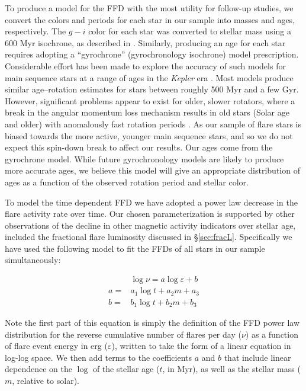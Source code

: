 \documentclass[preprint2]{aastex62}
\newcommand{\Kepler}{\textsl{Kepler}\xspace}
\begin{document}
To produce a model for the FFD with the most utility for follow-up studies, we convert the colors and periods for each star in our sample into masses and ages, respectively. The $g-i$ color for each star was converted to stellar mass using a 600 Myr isochrone, as described in \citet{davenport2016}. Similarly, producing an age for each star requires adopting a ``gyrochrone'' (gyrochronology isochrone) model prescription. Considerable effort has been made to explore the accuracy of such models for main sequence stars at a range of ages in the \Kepler era \citep[e.g.][]{mms+11,angus2015,douglas2016}. Most models produce similar age--rotation estimates for stars between roughly 500 Myr and a few Gyr. However, significant problems appear to exist for older, slower rotators, where a break in the angular momentum loss mechanism results in old stars (Solar age and older) with anomalously fast rotation periods \citep{van-saders2016}. As our sample of flare stars is biased towards the more active, younger main sequence stars, and so we do not expect this spin-down break to affect our results. Our ages come from the \citet{mamajek2008} gyrochrone model. While future gyrochronology models are likely to produce more accurate ages, we believe this model will give an appropriate distribution of ages as a function of the observed rotation period and stellar color.



To model the time dependent FFD we have adopted a power law decrease in the flare activity rate over time. Our chosen parameterization is supported by other observations of the decline in other magnetic activity indicators over stellar age, included the fractional flare luminosity discussed in \S\ref{sec:fracL}. Specifically we have used the following model to fit the FFDs of all stars in our sample simultaneously:

\begin{eqnarray}
\label{eqn:model}
& \log \nu = a \log \varepsilon + b\\
a =& a_1 \log t + a_2 m + a_3 \nonumber\\
b =& b_1 \log t + b_2 m + b_3 \nonumber 
\end{eqnarray}

\noindent
Note the first part of this equation is simply the definition of the FFD power law distribution for the reverse cumulative number of flares per day ($\nu$) as a function of flare event energy in erg ($\varepsilon$), written to take the form of a linear equation in log-log space. We then add terms to the coefficients $a$ and $b$ that include linear dependence on the $\log$ of the stellar age ($t$, in Myr), as well as the stellar mass ($m$, relative to solar).  
\end{document}
